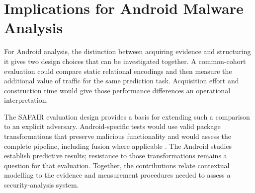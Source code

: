 \section{Implications for Android Malware Analysis}
\label{sec:discussion:implications}
\label{sec:discussion:7}

For Android analysis, the distinction between acquiring evidence and structuring it gives
two design choices that can be investigated together. A common-cohort evaluation could
compare static relational encodings and then measure the additional value of traffic for
the same prediction task. Acquisition effort and construction time would give those
performance differences an operational interpretation.

The SAFAIR evaluation design provides a basis for extending such a comparison to an
explicit adversary. Android-specific tests would use valid package transformations that
preserve malicious functionality and would assess the complete pipeline, including fusion
where applicable \cite{carlini2019evaluating}. The Android studies establish predictive
results; resistance to those transformations remains a question for that evaluation.
Together, the contributions relate contextual modelling to the evidence and measurement
procedures needed to assess a security-analysis system.
